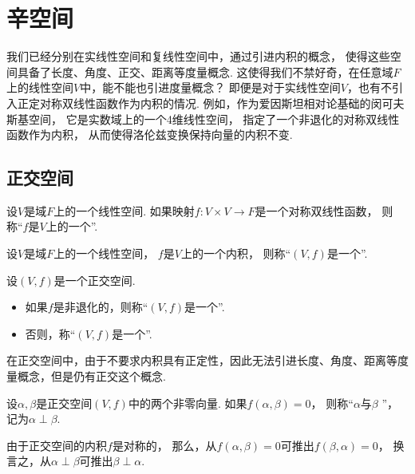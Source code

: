 \section{辛空间}
我们已经分别在实线性空间和复线性空间中，通过引进内积的概念，
使得这些空间具备了长度、角度、正交、距离等度量概念.
这使得我们不禁好奇，在任意域\(F\)上的线性空间\(V\)中，能不能也引进度量概念？
即便是对于实线性空间\(V\)，也有不引入正定对称双线性函数作为内积的情况.
例如，作为爱因斯坦相对论基础的闵可夫斯基空间，
它是实数域上的一个4维线性空间，
指定了一个非退化的对称双线性函数作为内积，
从而使得洛伦兹变换保持向量的内积不变.

\subsection{正交空间}
\begin{definition}
设\(V\)是域\(F\)上的一个线性空间.
如果映射\(f\colon V \times V \to F\)是一个对称双线性函数，
则称“\(f\)是\(V\)上的一个”.
\end{definition}

\begin{definition}
设\(V\)是域\(F\)上的一个线性空间，
\(f\)是\(V\)上的一个内积，
则称“\((V,f)\)是一个”.
\end{definition}

\begin{definition}
设\((V,f)\)是一个正交空间.
\begin{itemize}
	\item 如果\(f\)是非退化的，则称“\((V,f)\)是一个”.
	\item 否则，称“\((V,f)\)是一个”.
\end{itemize}
\end{definition}

在正交空间中，由于不要求内积具有正定性，因此无法引进长度、角度、距离等度量概念，但是仍有正交这个概念.
\begin{definition}
设\(\alpha,\beta\)是正交空间\((V,f)\)中的两个非零向量.
如果\(f(\alpha,\beta) = 0\)，
则称“\(\alpha\)与\(\beta\) ”，
记为\(\alpha \perp \beta\).
\end{definition}

由于正交空间的内积\(f\)是对称的，
那么，从\(f(\alpha,\beta) = 0\)可推出\(f(\beta,\alpha) = 0\)，
换言之，从\(\alpha \perp \beta\)可推出\(\beta \perp \alpha\).

